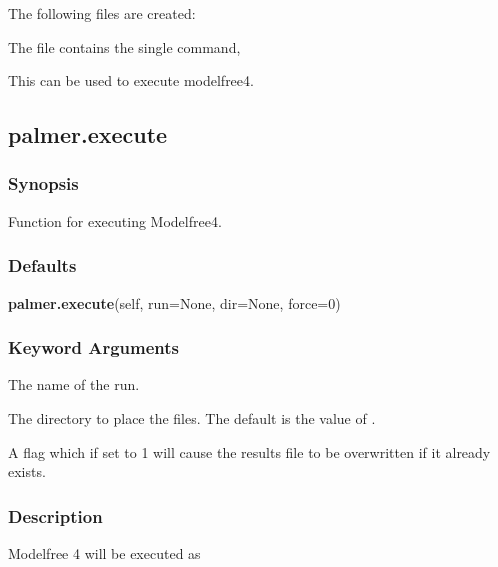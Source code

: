 The following files are created:
    

    

    

    

    


The file 
 contains the single command,
    

This can be used to execute modelfree4.


\newpage

\subsection{palmer.execute}


\subsubsection{Synopsis}

Function for executing Modelfree4.

\subsubsection{Defaults}

\textsf{\textbf{palmer.execute}(self, run=None, dir=None, force=0)}


\subsubsection{Keyword Arguments}


  The name of the run.

  The directory to place the files.  The default is the value of 
.

  A flag which if set to 1 will cause the results file to be overwritten if it already exists.

\subsubsection{Description}

Modelfree 4 will be executed as
    


